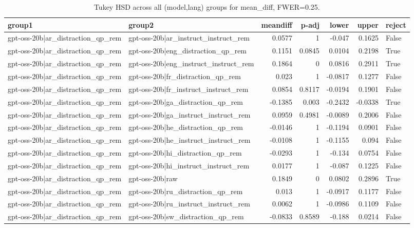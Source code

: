 \begin{table}
\caption{Tukey HSD across all (model,lang) groups for mean_diff, FWER=0.25.}
\label{tab:tukey_all_models_all_langs_mean_diff}
\begin{tabular}{l l r r r r l}
\toprule
group1 & group2 & meandiff & p-adj & lower & upper & reject \\
\midrule
gpt-oss-20b|ar_distraction_qp_rem & gpt-oss-20b|ar_instruct_instruct_rem & 0.0577 & 1 & -0.047 & 0.1625 & False \\
gpt-oss-20b|ar_distraction_qp_rem & gpt-oss-20b|eng_distraction_qp_rem & 0.1151 & 0.0845 & 0.0104 & 0.2198 & True \\
gpt-oss-20b|ar_distraction_qp_rem & gpt-oss-20b|eng_instruct_instruct_rem & 0.1864 & 0 & 0.0816 & 0.2911 & True \\
gpt-oss-20b|ar_distraction_qp_rem & gpt-oss-20b|fr_distraction_qp_rem & 0.023 & 1 & -0.0817 & 0.1277 & False \\
gpt-oss-20b|ar_distraction_qp_rem & gpt-oss-20b|fr_instruct_instruct_rem & 0.0854 & 0.8117 & -0.0194 & 0.1901 & False \\
gpt-oss-20b|ar_distraction_qp_rem & gpt-oss-20b|ga_distraction_qp_rem & -0.1385 & 0.003 & -0.2432 & -0.0338 & True \\
gpt-oss-20b|ar_distraction_qp_rem & gpt-oss-20b|ga_instruct_instruct_rem & 0.0959 & 0.4981 & -0.0089 & 0.2006 & False \\
gpt-oss-20b|ar_distraction_qp_rem & gpt-oss-20b|he_distraction_qp_rem & -0.0146 & 1 & -0.1194 & 0.0901 & False \\
gpt-oss-20b|ar_distraction_qp_rem & gpt-oss-20b|he_instruct_instruct_rem & -0.0108 & 1 & -0.1155 & 0.094 & False \\
gpt-oss-20b|ar_distraction_qp_rem & gpt-oss-20b|hi_distraction_qp_rem & -0.0293 & 1 & -0.134 & 0.0754 & False \\
gpt-oss-20b|ar_distraction_qp_rem & gpt-oss-20b|hi_instruct_instruct_rem & 0.0177 & 1 & -0.087 & 0.1225 & False \\
gpt-oss-20b|ar_distraction_qp_rem & gpt-oss-20b|raw & 0.1849 & 0 & 0.0802 & 0.2896 & True \\
gpt-oss-20b|ar_distraction_qp_rem & gpt-oss-20b|ru_distraction_qp_rem & 0.013 & 1 & -0.0917 & 0.1177 & False \\
gpt-oss-20b|ar_distraction_qp_rem & gpt-oss-20b|ru_instruct_instruct_rem & 0.0062 & 1 & -0.0986 & 0.1109 & False \\
gpt-oss-20b|ar_distraction_qp_rem & gpt-oss-20b|sw_distraction_qp_rem & -0.0833 & 0.8589 & -0.188 & 0.0214 & False \\

\end{tabular}
\end{table}
